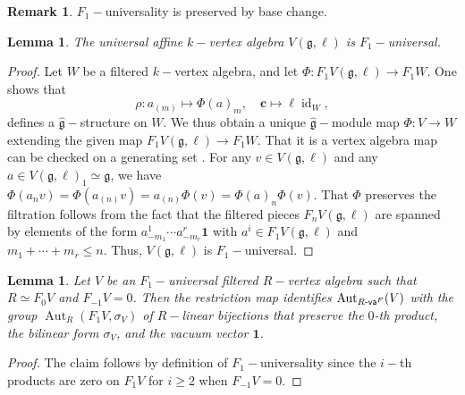 \documentclass{article}
\newtheorem{lem}[thm]{Lemma}
\theoremstyle{definition}
\newtheorem{rem}[thm]{Remark}
\def\id{\ensuremath{\operatorname{id}}}
\def\Aut{\ensuremath{\operatorname{Aut}}}
\def\Rfva{\ensuremath{R\text{-\textup{\textsf{va}}}}^F}
\begin{document}
\begin{rem}\label{F1basechange}
    $F_1-$universality is preserved by base change.
\end{rem}

\begin{lem}\label{uniaffisF1}
    The universal affine $k-$vertex algebra $V(\mathfrak g, \ell)$ is $F_1-$universal.
\end{lem}

\begin{proof}
    Let $W$ be a filtered $k-$vertex algebra, and let $\Phi \colon F_1 V(\mathfrak g, \ell) \to F_1 W$.
   One shows that 
    \[ \rho \colon a_{(m)} \mapsto \Phi(a)_m, \quad \mathbf c \mapsto \ell \id_W,\]
    defines a $\widehat {\mathfrak g}-$structure on $W$.
    We thus obtain a unique $\widehat {\mathfrak g}-$module map $\Phi \colon V \to W$ extending the given map $F_1 V(\mathfrak g, \ell) \to F_1 W$.
    That it is a vertex algebra map can be checked on a generating set \cite[\@5.7.9]{LL}.
    For any $v \in V(\mathfrak g, \ell)$ and any $a \in V(\mathfrak g, \ell)_1 \simeq \mathfrak g$, we have
    $\Phi(a_n v) = \Phi(a_{(n)} v) = a_{(n)} \Phi(v) = \Phi(a)_n \Phi(v). $
   That $\Phi$ preserves the filtration follows from the fact that the filtered pieces $F_n V(\mathfrak g, \ell)$ are spanned by elements of the form $a^1_{-m_1} \cdots a^r_{-m_r} \mathbf 1$ with $a^i \in F_1 V(\mathfrak g, \ell)$ and $m_1 + \cdots + m_r \leq n$.
    Thus, $V(\mathfrak g, \ell)$ is $F_1-$universal.
\end{proof}

\begin{lem}\label{isoF1res}
    Let $V$ be an $F_1-$universal filtered $R-$vertex algebra such that $R \simeq F_0 V$ and $F_{-1} V = 0$. 
    Then the restriction map identifies $\Aut_{\Rfva}(V)$ with the group $\Aut_R(F_1 V, \sigma_V)$ of $R-$linear bijections that preserve the $0$-th product, the bilinear form $\sigma_V$, and the vacuum vector $\mathbf 1$.
\end{lem}

\begin{proof}
    The claim follows by definition of $F_1-$universality since the $i-$th products are zero on $F_1 V$ for $i \geq 2$ when $F_{-1} V= 0$.
\end{proof}
\end{document}
